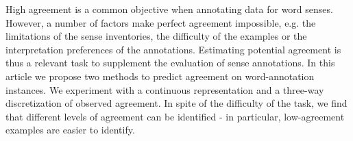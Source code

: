 High agreement is a common objective when annotating data for word senses. However, a number of factors make perfect agreement impossible, e.g. the limitations of the sense inventories, the difficulty of the examples or the interpretation preferences of the annotations. Estimating potential agreement is thus a relevant task to supplement the evaluation of sense annotations. In this article we propose two methods to predict agreement on word-annotation instances. We experiment with a continuous representation and a three-way discretization of observed agreement. In spite of the difficulty of the task, we find that different levels of agreement can be identified - in particular, low-agreement examples are easier to identify.
